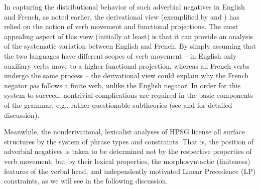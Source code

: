 \documentclass[output=paper
                ,modfonts
                ,nonflat
	        ,collection
	        ,collectionchapter
	        ,collectiontoclongg
 	        ,biblatex
                ,babelshorthands
                ,newtxmath
                ,draftmode
                ,colorlinks, citecolor=brown
]{./langsci/langscibook}
\begin{document}
{\begin{exe}
\begin{xlist}
\begin{exe}
\begin{xlist}
In capturing the distributional behavior of such adverbial negatives
in English and French, as noted earlier, the derivational view (exemplified by \citealt{Pollock:89} and \citealt{Chomsky:91})
has relied on the notion of verb
movement and functional projections.  The most appealing aspect of this
view (initially at least) is that it can provide an analysis of the
systematic variation
between English and French. By simply assuming that the
two languages have different scopes of verb movement -- in English
only auxiliary verbs move to a higher functional projection, whereas
all French verbs undergo the same process -- the derivational
view could explain why the French negator \textit{pas} follows
a finite verb, unlike the English negator.  In order for this system to succeed,
nontrivial complications are required in the basic components of the
grammar, e.g., rather questionable subtheories (see \citealt{Kim:00} and \citealt{KS:02}
for detailed discussion).

Meanwhile, the nonderivational, lexicalist analyses of HPSG
license all surface structures by the system of phrase types
and constraints.  That is, the position of
adverbial negatives is taken to be determined not by
the respective properties of verb movement, but by their lexical
properties, the morphosyntactic (finiteness) features of the verbal head,
and independently motivated Linear Precedence (LP) constraints, as
we will see in the following discussion.

\end{xlist}
\end{exe}
\end{xlist}
\end{exe}}
\end{document}
